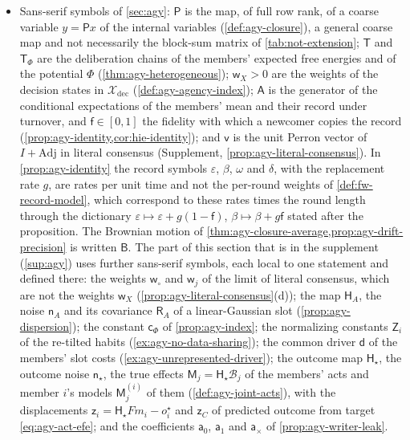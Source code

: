\begin{itemize}
\item Sans-serif symbols of \cref{sec:agy}: $\mathsf P$ is the map, of full row rank, of a coarse variable $y=\mathsf Px$ of the internal variables (\cref{def:agy-closure}), a general coarse map and not necessarily the block-sum matrix of \cref{tab:not-extension}; $\mathsf T$ and $\mathsf T_\Phi$ are the deliberation chains of the members' expected free energies and of the potential $\Phi$ (\cref{thm:agy-heterogeneous}); $\mathsf w_X>0$ are the weights of the decision states in $\mathcal X_{\mathrm{dec}}$ (\cref{def:agy-agency-index}); $\mathsf A$ is the generator of the conditional expectations of the members' mean and their record under turnover, and $\mathsf f\in[0,1]$ the fidelity with which a newcomer copies the record (\cref{prop:agy-identity,cor:hie-identity}); and $\mathsf v$ is the unit Perron vector of $I+\mathrm{Adj}$ in literal consensus (Supplement, \cref{prop:agy-literal-consensus}). In \cref{prop:agy-identity} the record symbols $\varepsilon$, $\beta$, $\omega$ and $\delta$, with the replacement rate $g$, are rates per unit time and not the per-round weights of \cref{def:fw-record-model}, which correspond to these rates times the round length through the dictionary $\varepsilon\mapsto\varepsilon+g(1-\mathsf f)$, $\beta\mapsto\beta+g\mathsf f$ stated after the proposition. The Brownian motion of \cref{thm:agy-closure-average,prop:agy-drift-precision} is written $\mathsf B$. The part of this section that is in the supplement (\cref{sup:agy}) uses further sans-serif symbols, each local to one statement and defined there: the weights $\mathsf w_\circ$ and $\mathsf w_j$ of the limit of literal consensus, which are not the weights $\mathsf w_X$ (\cref{prop:agy-literal-consensus}(d)); the map $\mathsf H_A$, the noise $\mathsf n_A$ and its covariance $\mathsf R_A$ of a linear-Gaussian slot (\cref{prop:agy-dispersion}); the constant $\mathsf c_\Phi$ of \cref{prop:agy-index}; the normalizing constants $\mathsf Z_i$ of the re-tilted habits (\cref{ex:agy-no-data-sharing}); the common driver $\mathsf d$ of the members' slot costs (\cref{ex:agy-unrepresented-driver}); the outcome map $\mathsf H_\star$, the outcome noise $\mathsf n_\star$, the true effects $\mathsf M_j=\mathsf H_\star\mathcal B_j$ of the members' acts and member $i$'s models $\mathsf M^{(i)}_j$ of them (\cref{def:agy-joint-acts}), with the displacements $\mathsf z_i=\mathsf H_\star Fm_i-o^\star_i$ and $\mathsf z_C$ of predicted outcome from target \eqref{eq:agy-act-efe}; and the coefficients $\mathsf a_0$, $\mathsf a_1$ and $\mathsf a_\times$ of \cref{prop:agy-writer-leak}.

\end{itemize}

